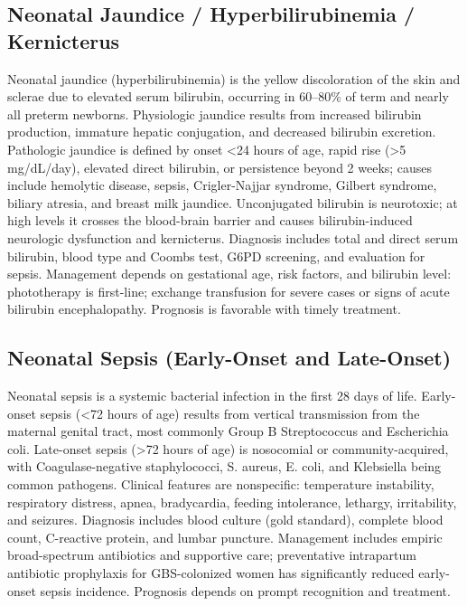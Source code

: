 \subsection{Neonatal Jaundice / Hyperbilirubinemia / Kernicterus}
\label{sec:Neonatal Jaundice}
Neonatal jaundice (hyperbilirubinemia) is the yellow discoloration of the skin and sclerae due to elevated serum bilirubin, occurring in 60--80\% of term and nearly all preterm newborns. Physiologic jaundice results from increased bilirubin production, immature hepatic conjugation, and decreased bilirubin excretion. Pathologic jaundice is defined by onset <24 hours of age, rapid rise (>5 mg/dL/day), elevated direct bilirubin, or persistence beyond 2 weeks; causes include hemolytic disease, sepsis, Crigler-Najjar syndrome, Gilbert syndrome, biliary atresia, and breast milk jaundice. Unconjugated bilirubin is neurotoxic; at high levels it crosses the blood-brain barrier and causes bilirubin-induced neurologic dysfunction and kernicterus. Diagnosis includes total and direct serum bilirubin, blood type and Coombs test, G6PD screening, and evaluation for sepsis. Management depends on gestational age, risk factors, and bilirubin level: phototherapy is first-line; exchange transfusion for severe cases or signs of acute bilirubin encephalopathy. Prognosis is favorable with timely treatment.

\subsection{Neonatal Sepsis (Early-Onset and Late-Onset)}
\label{sec:Neonatal Sepsis}
Neonatal sepsis is a systemic bacterial infection in the first 28 days of life. Early-onset sepsis (<72 hours of age) results from vertical transmission from the maternal genital tract, most commonly Group B Streptococcus and Escherichia coli. Late-onset sepsis (>72 hours of age) is nosocomial or community-acquired, with Coagulase-negative staphylococci, S. aureus, E. coli, and Klebsiella being common pathogens. Clinical features are nonspecific: temperature instability, respiratory distress, apnea, bradycardia, feeding intolerance, lethargy, irritability, and seizures. Diagnosis includes blood culture (gold standard), complete blood count, C-reactive protein, and lumbar puncture. Management includes empiric broad-spectrum antibiotics and supportive care; preventative intrapartum antibiotic prophylaxis for GBS-colonized women has significantly reduced early-onset sepsis incidence. Prognosis depends on prompt recognition and treatment.

